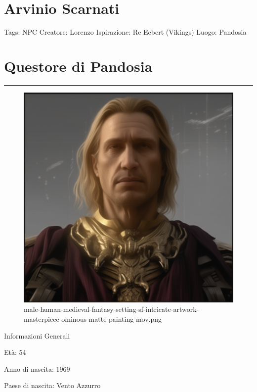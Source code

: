 \section{Arvinio Scarnati}\label{arvinio-scarnati}

Tags: NPC Creatore: Lorenzo Ispirazione: Re Ecbert (Vikings) Luogo:
Pandosia

\section{Questore di Pandosia}\label{questore-di-pandosia}

\begin{center}\rule{0.5\linewidth}{0.5pt}\end{center}

\begin{figure}
\centering
\includegraphics{male-human-medieval-fantasy-setting-sf-intricate-artwork-masterpiece-ominous-matte-painting-mov.png}
\caption{male-human-medieval-fantasy-setting-sf-intricate-artwork-masterpiece-ominous-matte-painting-mov.png}
\end{figure}

Informazioni Generali

Età: 54

Anno di nascita: 1969

Paese di nascita: Vento Azzurro

